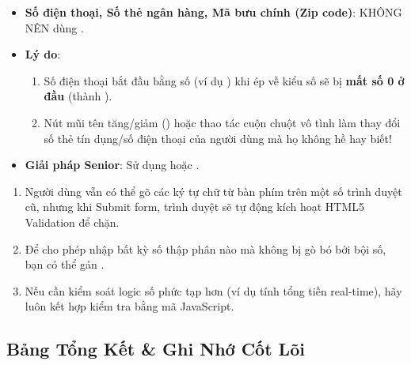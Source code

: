\begin{warnBox}[Bẫy UX Quan Trọng: Khi Nào KHÔNG NÊN Dùng input type="number"?]
\begin{itemize}[leftmargin=1.5em, itemsep=2pt, parsep=0pt]
    \item \textbf{Số điện thoại, Số thẻ ngân hàng, Mã bưu chính (Zip code)}: KHÔNG NÊN dùng .
    \item \textbf{Lý do}:
      \begin{enumerate}[leftmargin=1.2em, itemsep=1pt]
        \item Số điện thoại bắt đầu bằng số  (ví dụ ) khi ép về kiểu số sẽ bị \textbf{mất số 0 ở đầu} (thành ).
        \item Nút mũi tên tăng/giảm () hoặc thao tác cuộn chuột vô tình làm thay đổi số thẻ tín dụng/số điện thoại của người dùng mà họ không hề hay biết!
      \end{enumerate}
    \item \textbf{Giải pháp Senior}: Sử dụng  hoặc .
\end{itemize}
\end{warnBox}

\begin{tipBox}
\begin{enumerate}[leftmargin=1.5em, itemsep=2pt, parsep=0pt]
    \item Người dùng vẫn có thể gõ các ký tự chữ từ bàn phím trên một số trình duyệt cũ, nhưng khi Submit form, trình duyệt sẽ tự động kích hoạt HTML5 Validation để chặn.
    \item Để cho phép nhập bất kỳ số thập phân nào mà không bị gò bó bởi bội số, bạn có thể gán .
    \item Nếu cần kiểm soát logic số phức tạp hơn (ví dụ tính tổng tiền real-time), hãy luôn kết hợp kiểm tra bằng mã JavaScript.
\end{enumerate}
\end{tipBox}

\subsection{Bảng Tổng Kết \& Ghi Nhớ Cốt Lõi}

